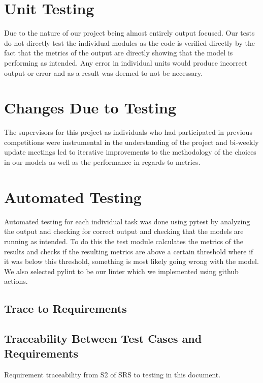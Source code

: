 \documentclass[12pt, titlepage]{article}
\begin{document}
\begin{enumerate}
\section{Unit Testing}


Due to the nature of our project being almost entirely output focused. Our
tests do not directly test the individual modules as the code is verified directly by the
fact that the metrics of the output are directly showing that the model is
performing as intended. Any error in individual units would produce incorrect output or error and as a result was deemed to not be necessary.


\section{Changes Due to Testing}


The supervisors for this project as individuals who had participated in previous competitions were instrumental in the understanding of the project and bi-weekly update meetings led to iterative improvements to the methodology of the choices in our models as well as the performance in regards to metrics.


\section{Automated Testing}


Automated testing for each individual task was done using pytest by analyzing the output and checking for correct output and checking that the models are running as intended. To do this the test module calculates the metrics of the results and checks if the resulting metrics are above a certain threshold where if it was below this threshold, something is most likely going wrong with the model. We also selected pylint to be our linter which we implemented using github actions.




\begin{landscape}
\section{Trace to Requirements}
   \subsection{Traceability Between Test Cases and Requirements}


   Requirement traceability from S2 of SRS to testing in this document.



\end{landscape}
\end{enumerate}
\end{document}
